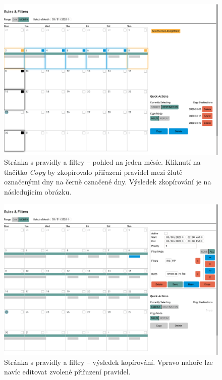 \begin{figure}[htb!] \centering
  \includegraphics[width=145mm]{../img/page_rules_filters2.png}
  \caption[Stránka s pravidly a filtry -- pohled na jeden měsíc.]{Stránka s pravidly a filtry -- pohled na jeden měsíc.
  Kliknutí na tlačítko \textit{Copy} by zkopírovalo přiřazení pravidel mezi žlutě označenými dny na černě označené dny.
  Výsledek zkopírování je na následujícím obrázku.}
  \label{fig:page_rules_filters2}
\end{figure}

\begin{figure}[htb!] \centering
  \includegraphics[width=145mm]{../img/page_rules_filters3.png}
  \caption[Stránka s pravidly a filtry -- výsledek kopírování.]{Stránka s pravidly a filtry -- výsledek kopírování.
  Vpravo nahoře lze navíc editovat zvolené přiřazení pravidel.}
  \label{fig:page_rules_filters3}
\end{figure}

